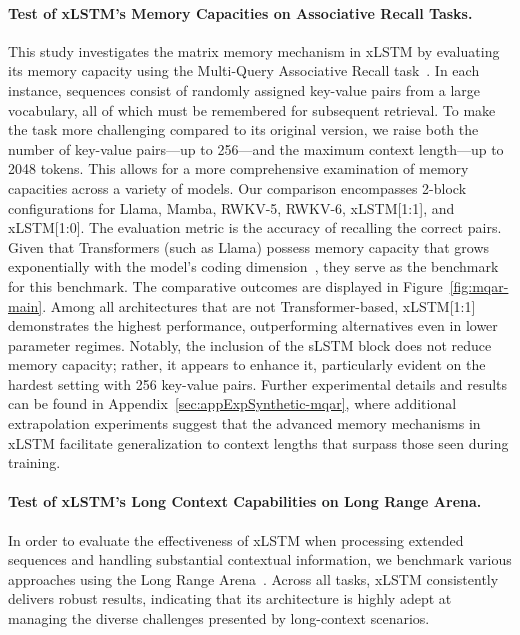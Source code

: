 \paragraph{Test of xLSTM's Memory Capacities on Associative Recall Tasks.} This study investigates the matrix memory mechanism in xLSTM by evaluating its memory capacity using the Multi-Query Associative Recall task~\citep{Arora:23arxiv}. In each instance, sequences consist of randomly assigned key-value pairs from a large vocabulary, all of which must be remembered for subsequent retrieval. To make the task more challenging compared to its original version, we raise both the number of key-value pairs—up to 256—and the maximum context length—up to 2048 tokens. This allows for a more comprehensive examination of memory capacities across a variety of models. Our comparison encompasses 2-block configurations for Llama, Mamba, RWKV-5, RWKV-6, xLSTM[1:1], and xLSTM[1:0]. The evaluation metric is the accuracy of recalling the correct pairs. Given that Transformers (such as Llama) possess memory capacity that grows exponentially with the model’s coding dimension~\citep{Ramsauer:21}, they serve as the benchmark for this benchmark. The comparative outcomes are displayed in Figure~\ref{fig:mqar-main}. 
Among all architectures that are not Transformer-based, xLSTM[1:1] demonstrates the highest performance, outperforming alternatives even in lower parameter regimes. Notably, the inclusion of the sLSTM block does not reduce memory capacity; rather, it appears to enhance it, particularly evident on the hardest setting with 256 key-value pairs. Further experimental details and results can be found in Appendix~\ref{sec:appExpSynthetic-mqar}, where additional extrapolation experiments suggest that the advanced memory mechanisms in xLSTM facilitate generalization to context lengths that surpass those seen during training.

\paragraph{Test of xLSTM's Long Context Capabilities on Long Range Arena.} In order to evaluate the effectiveness of xLSTM when processing extended sequences and handling substantial contextual information, we benchmark various approaches using the Long Range Arena~\citep{Tay:21}. Across all tasks, xLSTM consistently delivers robust results, indicating that its architecture is highly adept at managing the diverse challenges presented by long-context scenarios.

